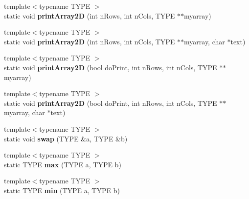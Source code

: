 \begin{DoxyCompactItemize}
\item 
\hypertarget{class_k_w_util_a0d00bcaaee4bf9fe1ea3f28c39db766d}{{\footnotesize template$<$typename T\-Y\-P\-E $>$ }\\static void {\bfseries print\-Array2\-D} (int n\-Rows, int n\-Cols, T\-Y\-P\-E $\ast$$\ast$myarray)}\label{class_k_w_util_a0d00bcaaee4bf9fe1ea3f28c39db766d}

\item 
\hypertarget{class_k_w_util_a8ca8f9d0826b637aee5285af196431a0}{{\footnotesize template$<$typename T\-Y\-P\-E $>$ }\\static void {\bfseries print\-Array2\-D} (int n\-Rows, int n\-Cols, T\-Y\-P\-E $\ast$$\ast$myarray, char $\ast$text)}\label{class_k_w_util_a8ca8f9d0826b637aee5285af196431a0}

\item 
\hypertarget{class_k_w_util_a2907060d81976090c40829107159666d}{{\footnotesize template$<$typename T\-Y\-P\-E $>$ }\\static void {\bfseries print\-Array2\-D} (bool do\-Print, int n\-Rows, int n\-Cols, T\-Y\-P\-E $\ast$$\ast$myarray)}\label{class_k_w_util_a2907060d81976090c40829107159666d}

\item 
\hypertarget{class_k_w_util_a59aabe5a32605da8367ca84c3ad3a0ab}{{\footnotesize template$<$typename T\-Y\-P\-E $>$ }\\static void {\bfseries print\-Array2\-D} (bool do\-Print, int n\-Rows, int n\-Cols, T\-Y\-P\-E $\ast$$\ast$myarray, char $\ast$text)}\label{class_k_w_util_a59aabe5a32605da8367ca84c3ad3a0ab}

\item 
\hypertarget{class_k_w_util_a6ed5d213169247c4b3fe3ed2fb96dd88}{{\footnotesize template$<$typename T\-Y\-P\-E $>$ }\\static void {\bfseries swap} (T\-Y\-P\-E \&a, T\-Y\-P\-E \&b)}\label{class_k_w_util_a6ed5d213169247c4b3fe3ed2fb96dd88}

\item 
\hypertarget{class_k_w_util_a707d699ad01c87ba21e06fe28de85712}{{\footnotesize template$<$typename T\-Y\-P\-E $>$ }\\static T\-Y\-P\-E {\bfseries max} (T\-Y\-P\-E a, T\-Y\-P\-E b)}\label{class_k_w_util_a707d699ad01c87ba21e06fe28de85712}

\item 
\hypertarget{class_k_w_util_af1b3640361810ba75435a850d73a2413}{{\footnotesize template$<$typename T\-Y\-P\-E $>$ }\\static T\-Y\-P\-E {\bfseries min} (T\-Y\-P\-E a, T\-Y\-P\-E b)}\label{class_k_w_util_af1b3640361810ba75435a850d73a2413}


\end{DoxyCompactItemize}
